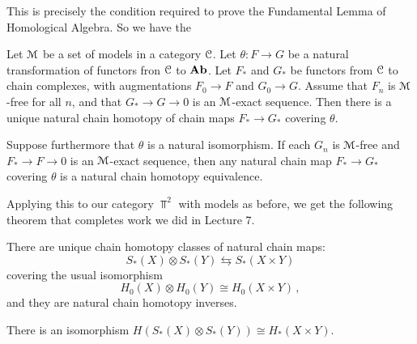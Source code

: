 This is precisely the condition required to prove the Fundamental Lemma
of Homological Algebra. So we have the 
\begin{theorem}
Let $\mathcal M$ be a set of models in a category $\mathcal C$. Let $\theta:F\to G$ be 
a natural transformation of functors fron $\mathcal C$ to $\mathbf{Ab}$. Let 
$F_*$ and $G_*$ be functors from $\mathcal C$ to chain complexes, with augmentations
$F_0\to F$ and $G_0\to G$. Assume that $F_n$ is $\mathcal M$-free for all $n$, and
that $G_*\to G\to0$ is an $\mathcal M$-exact sequence. Then there is a unique natural
chain homotopy of chain maps $F_*\to G_*$ covering $\theta$. 
\end{theorem}
\begin{corollary}
Suppose furthermore that $\theta$ is a natural isomorphism. If
each $G_n$ is $\mathcal M$-free and $F_*\to F\to0$ is an $\mathcal M$-exact
sequence, then any natural chain map $F_*\to G_*$ covering $\theta$ is  
a natural chain homotopy equivalence. 
\end{corollary}

Applying this to our category $\Top^2$ with models as before, we get 
the following theorem that completes work we did in Lecture 7.
\begin{theorem}
There are unique chain homotopy classes of natural chain maps:
\begin{equation*}
S_\ast(X)\otimes S_\ast(Y)\leftrightarrows S_\ast(X\times Y)
\end{equation*}
covering the usual isomorphism
\[
H_0(X)\otimes H_0(Y)\cong H_0(X\times Y)\,,
\]
and they are natural chain homotopy inverses. 
\end{theorem}
\begin{corollary}
There is an isomorphism $H(S_\ast(X)\otimes S_\ast(Y))\cong H_\ast(X\times Y)$.
\end{corollary}

